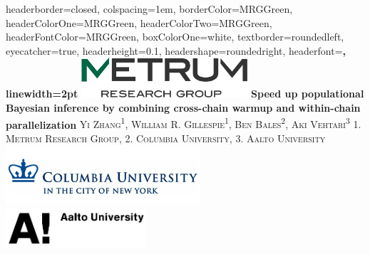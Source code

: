 \documentclass[landscape,a0paper,fontscale=0.45]{baposter} %
\begin{document}
\begin{poster}
{
headerborder=closed, %
colspacing=1em, %
borderColor=MRGGreen, %
headerColorOne=MRGGreen, %
headerColorTwo=MRGGreen, %
headerFontColor=MRGGreen, %
boxColorOne=white, %
textborder=roundedleft, %
eyecatcher=true, %
headerheight=0.1\textheight, %
headershape=roundedright, %
headerfont=\Large\bf\textsc, %
linewidth=2pt %
}
%
{\includegraphics[height=4em]{graphics/logo.jpg}} %
{\bf{Speed up populational Bayesian inference by combining cross-chain warmup and within-chain parallelization}\vspace{0.8em}} %
{\textsc{ Yi Zhang\textsuperscript{1}, William R. Gillespie\textsuperscript{1}, Ben Bales\textsuperscript{2}, Aki Vehtari\textsuperscript{3} \hspace{12pt} \normalsize{1. Metrum Research Group, 2. Columbia University, 3. Aalto University}}} %
{\includegraphics[height=6em]{graphics/alumnae_columbia.png}\\
\includegraphics[height=4em]{graphics/Aalto_EN_13_BLACK_1_Original.png}
} %



\end{poster}
\end{document}
